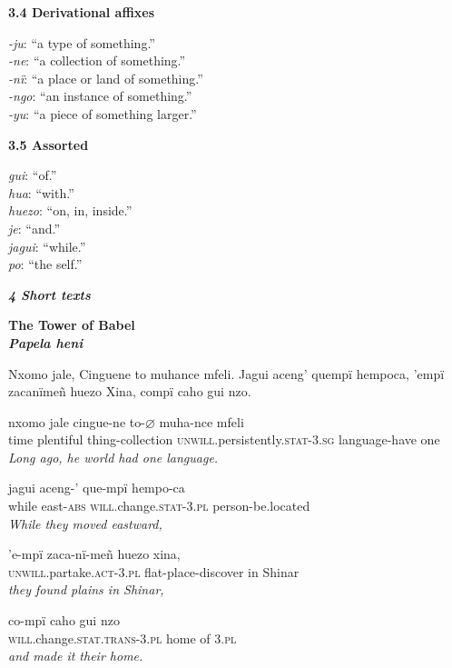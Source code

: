 \documentclass{article}[10pt]
\newcommand{\define}[2]{\emph{#1}: ``#2.'' \\}
\begin{document}
{\bf 3.4 Derivational affixes}
\begin{multicols}{3}
\noindent
\define{-ju}{a type of something}
\define{-ne}{a collection of something}
\define{-n\"{i}}{a place or land of something}
\define{-ngo}{an instance of something}
\define{-yu}{a piece of something larger}
\end{multicols}

{\bf 3.5 Assorted}
\begin{multicols}{3}
\noindent
\define{gui}{of}
\define{hua}{with}
\define{huezo}{on, in, inside}
\define{je}{and}
\define{jagui}{while}
\define{po}{the self}
\end{multicols}

\clearpage
{\bf \emph{4 Short texts}}\\

\begin{center}
\bf The Tower of Babel\\
\emph{Papela heni}\\
\end{center}

Nxomo jale, Cinguene to muhance mfeli. Jagui aceng' quemp\"{i} hempoca, 'emp\"{i} zacan\"{i}me\~{n} huezo Xina, comp\"{i} caho gui nzo.

\begin{exe}
\ex
\gll nxomo jale cingue-ne to-$\varnothing$ muha-nce mfeli\\
time plentiful thing-collection \textsc{unwill}.persistently.\textsc{stat}-3.\textsc{sg} language-have one\\
\trans \emph{Long ago, he world had one language.}

\ex
\gll jagui aceng-' que-mp\"{i} hempo-ca\\
while east-\textsc{abs} \textsc{will}.change.\textsc{stat}-3.\textsc{pl} person-be.located\\
\trans \emph{While they moved eastward,}

\ex
\gll 'e-mp\"{i} zaca-n\"{i}-me\~{n} huezo xina,\\
\textsc{unwill}.partake.\textsc{act}-3.\textsc{pl} flat-place-discover in Shinar\\
\trans \emph{they found plains in Shinar,}

\ex
\gll co-mp\"{i} caho gui nzo\\
\textsc{will}.change.\textsc{stat}.\textsc{trans}-3.\textsc{pl} home of 3.\textsc{pl}\\
\trans \emph{and made it their home.}
\end{exe}
\end{document}
